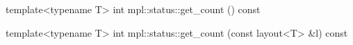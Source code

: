 template<typename T>
int mpl::status::get_count () const
 
template<typename T>
int mpl::status::get_count (const layout<T> &l) const
